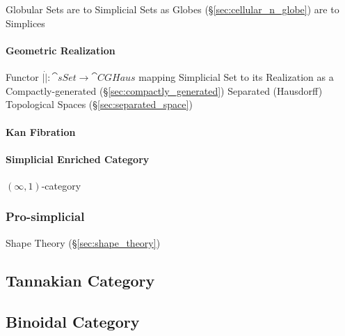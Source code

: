 Globular Sets are to Simplicial Sets as Globes (\S\ref{sec:cellular_n_globe})
are to Simplices



\paragraph{Geometric Realization}\label{sec:geometric_realization}\hfill

Functor $|\dot| : \cat{sSet} \rightarrow \cat{CGHaus}$ mapping
Simplicial Set to its Realization as a Compactly-generated
(\S\ref{sec:compactly_generated}) Separated (Hausdorff) Topological Spaces
(\S\ref{sec:separated_space})



\paragraph{Kan Fibration}\label{sec:kan_fibration}\hfill

\paragraph{Simplicial Enriched Category}\hfill
\label{sec:simplicial_enriched}

$(\infty,1)$-category %



\subsubsection{Pro-simplicial}\label{sec:pro_simplicial}

Shape Theory (\S\ref{sec:shape_theory})



\subsection{Tannakian Category}\label{sec:tannakian_category}

\subsection{Binoidal Category}\label{sec:binoidal_category}

